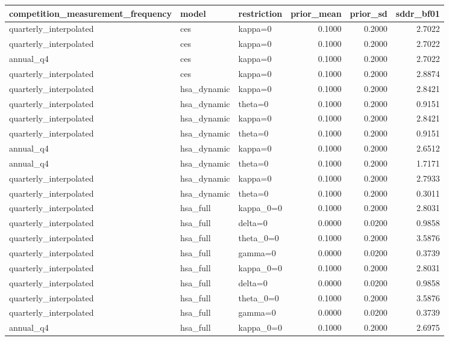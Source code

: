 \begin{tabular}{lllrrr}
\toprule
competition\_measurement\_frequency & model & restriction & prior\_mean & prior\_sd & sddr\_bf01 \\
\midrule
quarterly\_interpolated & ces & kappa=0 & 0.1000 & 0.2000 & 2.7022 \\
quarterly\_interpolated & ces & kappa=0 & 0.1000 & 0.2000 & 2.7022 \\
annual\_q4 & ces & kappa=0 & 0.1000 & 0.2000 & 2.7022 \\
quarterly\_interpolated & ces & kappa=0 & 0.1000 & 0.2000 & 2.8874 \\
quarterly\_interpolated & hsa\_dynamic & kappa=0 & 0.1000 & 0.2000 & 2.8421 \\
quarterly\_interpolated & hsa\_dynamic & theta=0 & 0.1000 & 0.2000 & 0.9151 \\
quarterly\_interpolated & hsa\_dynamic & kappa=0 & 0.1000 & 0.2000 & 2.8421 \\
quarterly\_interpolated & hsa\_dynamic & theta=0 & 0.1000 & 0.2000 & 0.9151 \\
annual\_q4 & hsa\_dynamic & kappa=0 & 0.1000 & 0.2000 & 2.6512 \\
annual\_q4 & hsa\_dynamic & theta=0 & 0.1000 & 0.2000 & 1.7171 \\
quarterly\_interpolated & hsa\_dynamic & kappa=0 & 0.1000 & 0.2000 & 2.7933 \\
quarterly\_interpolated & hsa\_dynamic & theta=0 & 0.1000 & 0.2000 & 0.3011 \\
quarterly\_interpolated & hsa\_full & kappa\_0=0 & 0.1000 & 0.2000 & 2.8031 \\
quarterly\_interpolated & hsa\_full & delta=0 & 0.0000 & 0.0200 & 0.9858 \\
quarterly\_interpolated & hsa\_full & theta\_0=0 & 0.1000 & 0.2000 & 3.5876 \\
quarterly\_interpolated & hsa\_full & gamma=0 & 0.0000 & 0.0200 & 0.3739 \\
quarterly\_interpolated & hsa\_full & kappa\_0=0 & 0.1000 & 0.2000 & 2.8031 \\
quarterly\_interpolated & hsa\_full & delta=0 & 0.0000 & 0.0200 & 0.9858 \\
quarterly\_interpolated & hsa\_full & theta\_0=0 & 0.1000 & 0.2000 & 3.5876 \\
quarterly\_interpolated & hsa\_full & gamma=0 & 0.0000 & 0.0200 & 0.3739 \\
annual\_q4 & hsa\_full & kappa\_0=0 & 0.1000 & 0.2000 & 2.6975 \\

\end{tabular}
